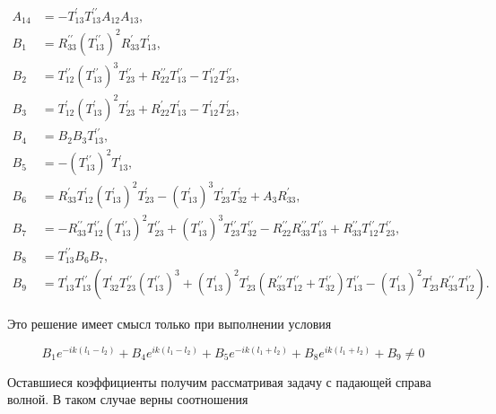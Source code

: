 \documentclass[a4 paper, 12 pt]{extarticle}
\begin{document}
\[\begin{aligned}
   A_{14} &= -T_{13}^\prime T_{13}^{\prime\prime} A_{12} A_{13}, \\
   B_1 &= R_{33}^{\prime\prime} (T_{13}^{\prime\prime})^2 R_{33}^\prime T_{13}^\prime, \\
   B_2 &= T_{12}^{\prime\prime} (T_{13}^{\prime\prime})^3 T_{23}^{\prime\prime} + R_{22}^{\prime\prime} T_{13}^{\prime\prime} - T_{12}^{\prime\prime} T_{23}^{\prime\prime}, \\
   B_3 &= T_{12}^\prime (T_{13}^\prime)^2 T_{23}^\prime + R_{22}^\prime T_{13}^\prime - T_{12}^\prime T_{23}^\prime, \\
   B_4 &= B_2 B_3 T_{13}^{\prime\prime}, \\
   B_5 &= -(T_{13}^{\prime\prime})^2 T_{13}^\prime, \\
   B_6 &= R_{33}^\prime T_{12}^\prime (T_{13}^\prime)^2 T_{23}^\prime - (T_{13}^\prime)^3 T_{23}^\prime T_{32}^\prime + A_3 R_{33}^\prime, \\
   B_7 &= -R_{33}^{\prime\prime} T_{12}^{\prime\prime} (T_{13}^{\prime\prime})^2 T_{23}^{\prime\prime} + (T_{13}^{\prime\prime})^3 T_{23}^{\prime\prime} T_{32}^{\prime\prime} - R_{22}^{\prime\prime} R_{33}^{\prime\prime} T_{13}^{\prime\prime} + R_{33}^{\prime\prime} T_{12}^{\prime\prime} T_{23}^{\prime\prime}, \\
   B_8 &= T_{13}^{\prime\prime} B_6 B_7, \\
   B_9 &= T_{13}^\prime T_{13}^{\prime\prime} \left(T_{32}^\prime T_{23}^{\prime\prime} (T_{13}^{\prime\prime})^3 + (T_{13}^\prime)^2 T_{23}^\prime \left(R_{33}^{\prime\prime} T_{12}^{\prime\prime} + T_{32}^{\prime\prime}\right)T_{13}^{\prime\prime} - (T_{13}^\prime)^2 T_{23}^\prime R_{33}^{\prime\prime} T_{12}^{\prime\prime}\right).
   \end{aligned}\]
   
   Это решение имеет смысл только при выполнении условия
   
   \begin{equation}
   \label{cond2}
   {B_1 e^{-ik\left(l_1-l_2\right)} + B_4 e^{ik\left(l_1-l_2\right)} + B_5 e^{-ik\left(l_1+l_2\right)} + B_8 e^{ik\left(l_1+l_2\right)} + B_9}\neq 0
   \end{equation}
   
   Оставшиеся коэффициенты получим рассматривая задачу с падающей справа волной. В таком случае верны соотношения
   
\end{document}
